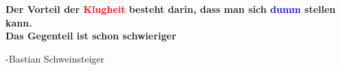 \documentclass[a6paper, 12pt]{article}
\begin{document}
\cfoot{}
\begin{center}
\textbf{
\glqq Der Vorteil der \textcolor{red}{Klugheit} besteht darin, dass man sich \textcolor{blue}{dumm} stellen kann. \\Das Gegenteil ist schon schwieriger\grqq}
\end{center}
\begin{flushright}
\tiny{-Bastian Schweinsteiger}
\end{flushright}

\listoftables
\end{document}
